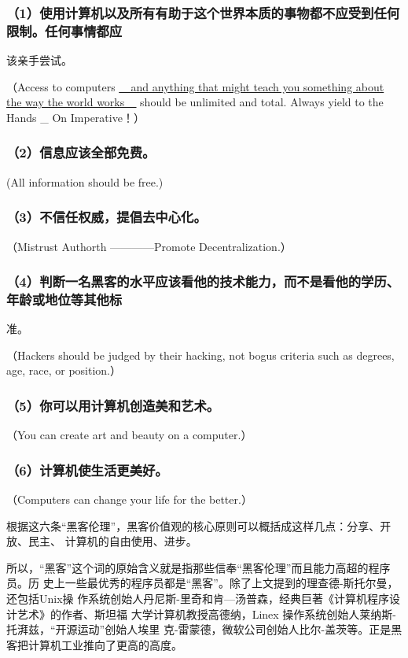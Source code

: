 \documentclass[11pt]{ctexart}
\begin{document}
{{{{\subsubsection{（1）使用计算机以及所有有助于这个世界本质的事物都不应受到任何限制。任何事情都应}
\label{sec:orgfafc680}
该亲手尝试。

（Access to computers \uline{\_ and anything that might teach you something about the
way the world works \_} should be unlimited and total. Always yield to the Hands
\_ On Imperative！）
\subsubsection{（2）信息应该全部免费。}
\label{sec:org671d667}

(All information should be free.)

\subsubsection{（3）不信任权威，提倡去中心化。}
\label{sec:org850f93b}

（Mistrust Authorth ————Promote Decentralization.）

\subsubsection{（4）判断一名黑客的水平应该看他的技术能力，而不是看他的学历、年龄或地位等其他标}
\label{sec:orge970ca3}
准。

（Hackers should be judged by their hacking, not bogus criteria such as degrees,
age, race, or position.）

\subsubsection{（5）你可以用计算机创造美和艺术。}
\label{sec:org053ee7e}

（You can create art and beauty on a computer.）

\subsubsection{（6）计算机使生活更美好。}
\label{sec:org6e2a9d6}

（Computers can change your life for the better.）

根据这六条“黑客伦理”，黑客价值观的核心原则可以概括成这样几点：分享、开放、民主、
计算机的自由使用、进步。

所以，“黑客”这个词的原始含义就是指那些信奉“黑客伦理”而且能力高超的程序员。历
史上一些最优秀的程序员都是“黑客”。除了上文提到的理查德-斯托尔曼，还包括Unix操
作系统创始人丹尼斯-里奇和肯—汤普森，经典巨著《计算机程序设计艺术》的作者、斯坦福
大学计算机教授高德纳，Linex 操作系统创始人莱纳斯-托湃兹，“开源运动”创始人埃里
克-雷蒙德，微软公司创始人比尔-盖茨等。正是黑客把计算机工业推向了更高的高度。

}}}}
\end{document}
